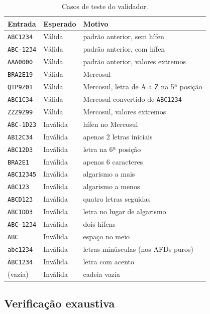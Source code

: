 \begin{table}[ht]
\centering
\small
\renewcommand{\arraystretch}{1.1}
\begin{tabular}{llp{6.3cm}}
\toprule
Entrada & Esperado & Motivo \\
\midrule
\texttt{ABC1234}   & Válida   & padrão anterior, sem hífen \\
\texttt{ABC-1234}  & Válida   & padrão anterior, com hífen \\
\texttt{AAA0000}   & Válida   & padrão anterior, valores extremos \\
\texttt{BRA2E19}   & Válida   & Mercosul \\
\texttt{QTP9Z01}   & Válida   & Mercosul, letra de A a Z na 5ª posição \\
\texttt{ABC1C34}   & Válida   & Mercosul convertido de \texttt{ABC1234} \\
\texttt{ZZZ9Z99}   & Válida   & Mercosul, valores extremos \\
\midrule
\texttt{ABC-1D23}  & Inválida & hífen no Mercosul \\
\texttt{AB12C34}   & Inválida & apenas 2 letras iniciais \\
\texttt{ABC12D3}   & Inválida & letra na 6ª posição \\
\texttt{BRA2E1}    & Inválida & apenas 6 caracteres \\
\texttt{ABC12345}  & Inválida & algarismo a mais \\
\texttt{ABC123}    & Inválida & algarismo a menos \\
\texttt{ABCD123}   & Inválida & quatro letras seguidas \\
\texttt{ABC1DD3}   & Inválida & letra no lugar de algarismo \\
\texttt{ABC--1234} & Inválida & dois hífens \\
\texttt{ABC\textvisiblespace 1234} & Inválida & espaço no meio \\
\texttt{abc1234}   & Inválida & letras minúsculas (nos AFDs puros) \\
\texttt{ÁBC1234}   & Inválida & letra com acento \\
(vazia)            & Inválida & cadeia vazia \\
\bottomrule
\end{tabular}
\caption{Casos de teste do validador.}
\label{tab:testes}
\end{table}

\subsection{Verificação exaustiva}

